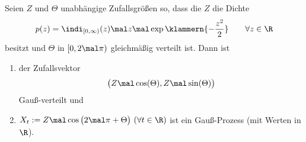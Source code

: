 \begin{aufgabenr}\label{aufg:12}\enter
	Seien $Z$ und $\Theta$ unabhängige Zufallsgrößen so, dass die $Z$ die Dichte
	\begin{align*}
		p(z)=\indi_{[0,\infty)}(z)\mal z\mal\exp\klammern{-\frac{z^2}{2}}\qquad\forall z\in\R
	\end{align*}
	besitzt und $ \Theta$ in $[0,2\mal\pi)$ gleichmäßig verteilt ist.
	Dann ist
	\begin{enumerate}[label=(\alph*)]
		\item der Zufallsvektor
		\begin{align*}
			\big(Z\mal\cos(\Theta),Z\mal\sin(\Theta)\big)
		\end{align*}
		Gauß-verteilt und
		\item $\begin{aligned}
			X_t:=Z\mal\cos\big(2\mal\pi+\Theta\big)~(\forall t\in\R)
		\end{aligned}$
		ist ein Gauß-Prozess (mit Werten in $\R$).
	\end{enumerate}
\end{aufgabenr}











